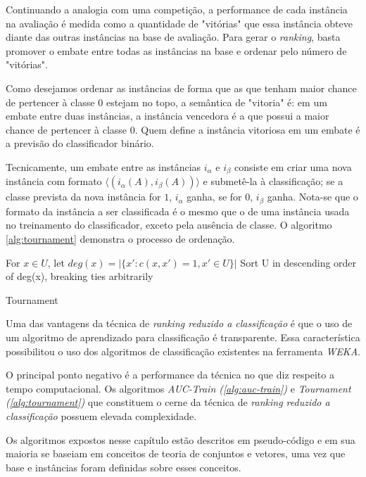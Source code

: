 Continuando a analogia com uma competição, a performance de cada instância na avaliação é medida como a quantidade de "vitórias" que essa instância obteve diante das outras instâncias na base de avaliação. Para gerar o \emph{ranking}, basta promover o embate entre todas as instâncias na base e ordenar pelo número de "vitórias".

Como desejamos ordenar as instâncias de forma que as que tenham maior chance de pertencer à classe $0$ estejam no topo, a semântica de "vitoria" é: em um embate entre duas instâncias, a instância vencedora é a que possui a maior chance de pertencer à classe $0$. Quem define a instância vitoriosa em um embate é a previsão do classificador binário.

Tecnicamente, um embate entre as instâncias $i_\alpha$ e $i_\beta$ consiste em criar uma nova instância com formato $\langle (i_{\alpha}(A), i_{\beta}(A))\rangle$ e submetê-la à classificação; se a classe prevista da nova instância for $1$, $i_{\alpha}$ ganha, se for $0$, $i_{\beta}$ ganha. Nota-se que o formato da instância a ser classificada é o mesmo que o de uma instância usada no treinamento do classificador, exceto pela ausência de classe. O algoritmo \ref{alg:tournament} demonstra o processo de ordenação.

\begin{algorithm}[H]
    For $x \in U$, let $deg(x) = |\{x':c(x, x') = 1, x' \in U\}|$\;
    Sort U in descending order of deg(x), breaking ties arbitrarily
    
    \caption{Tournament}
    \label{alg:tournament}
\end{algorithm}

Uma das vantagens da técnica de \emph{ranking reduzido a classificação} é que o uso de um algoritmo de aprendizado para classificação é transparente. Essa característica possibilitou o uso dos algoritmos de classificação existentes na ferramenta \emph{WEKA}.

O principal ponto negativo é a performance da técnica no que diz respeito a tempo computacional. Os algoritmos \emph{AUC-Train (\ref{alg:auc-train})} e \emph{Tournament (\ref{alg:tournament})} que constituem o cerne da técnica de \emph{ranking reduzido a classificação} possuem elevada complexidade.

Os algoritmos expostos nesse capítulo estão descritos em pseudo-código e em sua maioria se baseiam em conceitos de teoria de conjuntos e vetores, uma vez que base e instâncias foram definidas sobre esses conceitos.

